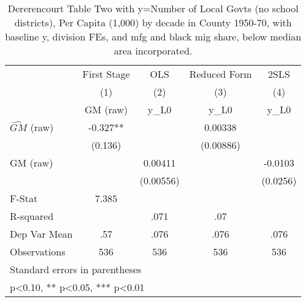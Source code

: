 \begin{table}[htbp]\centering
\def\sym#1{\ifmmode^{#1}\else\(^{#1}\)\fi}
\caption{Dererencourt Table Two with y=Number of Local Govts (no school districts), Per Capita (1,000) by decade in County 1950-70, with baseline y, division FEs, and mfg and black mig share, below median area incorporated.}
\begin{tabular}{l*{4}{c}}
\toprule
                    & First Stage   &         OLS   &Reduced Form   &        2SLS   \\
                    &\multicolumn{1}{c}{(1)}&\multicolumn{1}{c}{(2)}&\multicolumn{1}{c}{(3)}&\multicolumn{1}{c}{(4)}\\
                    &\multicolumn{1}{c}{GM  (raw)}&\multicolumn{1}{c}{y\_L0}&\multicolumn{1}{c}{y\_L0}&\multicolumn{1}{c}{y\_L0}\\
\midrule
$\hat{GM}$ (raw)    &      -0.327** &               &     0.00338   &               \\
                    &     (0.136)   &               &   (0.00886)   &               \\
\addlinespace
GM  (raw)           &               &     0.00411   &               &     -0.0103   \\
                    &               &   (0.00556)   &               &    (0.0256)   \\
\midrule
F-Stat              &       7.385   &               &               &               \\
R-squared           &               &        .071   &         .07   &               \\
Dep Var Mean        &         .57   &        .076   &        .076   &        .076   \\
Observations        &         536   &         536   &         536   &         536   \\
\bottomrule
\multicolumn{5}{l}{\footnotesize Standard errors in parentheses}\\
\multicolumn{5}{l}{\footnotesize * p<0.10, ** p<0.05, *** p<0.01}\\
\end{tabular}
\end{table}

